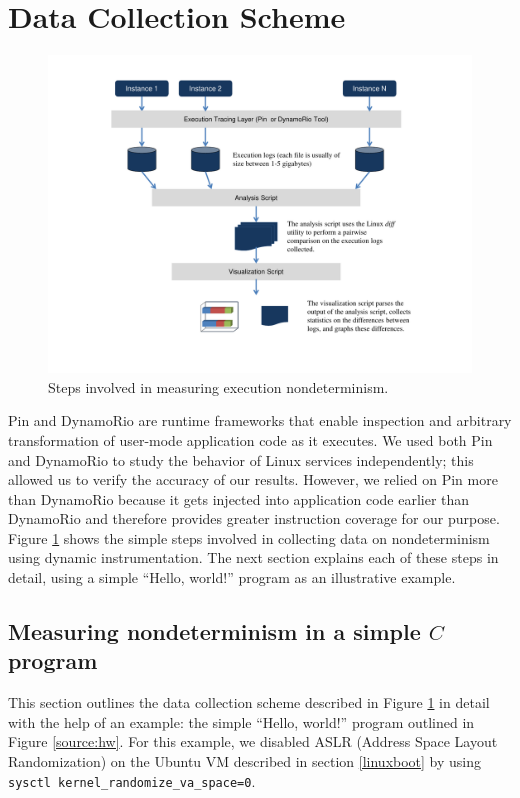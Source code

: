\section{Data Collection Scheme} \label{datacollection}
\begin{figure}[h]
  \center
  \includegraphics[width=1.0\textwidth, trim=1cm 1cm 1cm 1cm]
                  {naivedatacollection.pdf}
  \caption[Steps involved in measuring execution nondeterminism]%
  {Steps involved in measuring execution nondeterminism.}
  \label{data:naive}
\end{figure}

Pin and DynamoRio are runtime frameworks that enable inspection
and arbitrary transformation of user-mode application code as it executes.
We used both Pin and DynamoRio to study the behavior
of Linux services independently; this allowed us to verify
the accuracy of our results. However, we relied on Pin more 
than DynamoRio because it gets injected into application code
earlier than DynamoRio and therefore provides greater
instruction coverage for our purpose.  Figure \ref{data:naive} shows the simple steps involved
in collecting data on nondeterminism using
dynamic instrumentation. The next section 
explains each of these steps in detail, 
using a simple ``Hello, world!'' program as an illustrative example.

\subsection{Measuring nondeterminism in a simple $C$ program} \label{ch:hw}
This section outlines the data collection scheme
described in Figure \ref{data:naive} in detail with the help
of an example:  the simple ``Hello, world!'' program
outlined in Figure \ref{source:hw}.
For this example, we disabled ASLR (Address Space Layout
Randomization) on the Ubuntu VM described in section \ref{linuxboot}
by using \texttt{sysctl kernel\_randomize\_va\_space=0}. \newline

